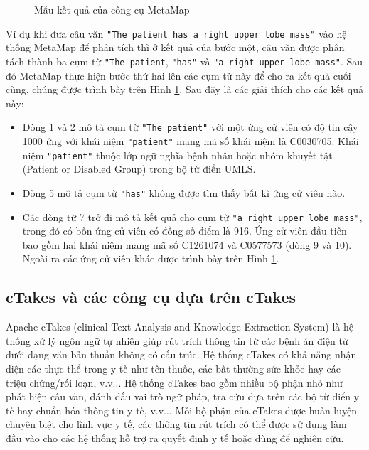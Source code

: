 \begin{figure}[ht]
\centering
{}

\caption{Mẫu kết quả của công cụ MetaMap\label{metamapoutput}}
\end{figure}

Ví dụ khi đưa câu văn \texttt{"The patient has a right upper lobe mass"} vào hệ thống MetaMap để phân tích thì ở kết quả của bước một, câu văn được phân tách thành ba cụm từ \texttt{"The patient}, \texttt{"has"} và \texttt{"a right upper lobe mass"}. Sau đó MetaMap thực hiện bước thứ hai lên các cụm từ này để cho ra kết quả cuối cùng, chúng được trình bày trên Hình \ref{metamapoutput}. Sau đây là các giải thích cho các kết quả này:

\begin{itemize}
\item Dòng 1 và 2 mô tả cụm từ \texttt{"The patient"} với một ứng cử viên có độ tin cậy 1000 ứng với khái niệm \texttt{"patient"} mang mã số khái niệm là C0030705. Khái niệm \texttt{"patient"} thuộc lớp ngữ nghĩa bệnh nhân hoặc nhóm khuyết tật (Patient or Disabled Group) trong bộ từ điển UMLS.
\item Dòng 5 mô tả cụm từ \texttt{"has"} không được tìm thấy bất kì ứng cử viên nào.
\item Các dòng từ 7 trở đi mô tả kết quả cho cụm từ \texttt{"a right upper lobe mass"}, trong đó có bốn ứng cử viên có đồng số điểm là 916. Ứng cử viên đầu tiên bao gồm hai khái niệm mang mã số C1261074 và C0577573 (dòng 9 và 10). Ngoài ra các ứng cử viên khác được trình bày trên Hình \ref{metamapoutput}. 
\end{itemize}

\subsection*{cTakes và các công cụ dựa trên cTakes}
Apache cTakes (clinical Text Analysis and Knowledge Extraction System) là hệ thống xử lý ngôn ngữ tự nhiên giúp rút trích thông tin từ các bệnh án điện tử dưới dạng văn bản thuần không có cấu trúc. Hệ thống cTakes có khả năng nhận diện các thực thể trong y tế như tên thuốc, các bất thường sức khỏe hay các triệu chứng/rối loạn, v.v... Hệ thống cTakes bao gồm nhiều bộ phận nhỏ như phát hiện câu văn, đánh dấu vai trò ngữ pháp, tra cứu dựa trên các bộ từ điển y tế hay chuẩn hóa thông tin y tế, v.v... Mỗi bộ phận của cTakes được huấn luyện chuyên biệt cho lĩnh vực y tế, các thông tin rút trích có thể được sử dụng làm đầu vào cho các hệ thống hỗ trợ ra quyết định y tế hoặc dùng để nghiên cứu.

